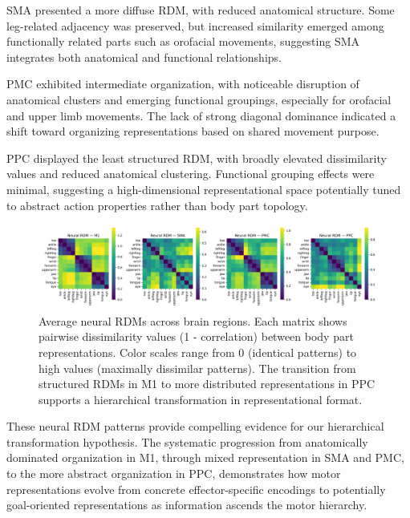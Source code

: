 \documentclass{article}
\begin{document}
SMA presented a more diffuse RDM, with reduced anatomical structure. Some leg-related adjacency was preserved, but increased similarity emerged among functionally related parts such as orofacial movements, suggesting SMA integrates both anatomical and functional relationships.

PMC exhibited intermediate organization, with noticeable disruption of anatomical clusters and emerging functional groupings, especially for orofacial and upper limb movements. The lack of strong diagonal dominance indicated a shift toward organizing representations based on shared movement purpose.

PPC displayed the least structured RDM, with broadly elevated dissimilarity values and reduced anatomical clustering. Functional grouping effects were minimal, suggesting a high-dimensional representational space potentially tuned to abstract action properties rather than body part topology.

\begin{figure}[!htbp] 
\centering 
\includegraphics[width=\textwidth]{results/average_neural_rdms.png} 
\caption{Average neural RDMs across brain regions. Each matrix shows pairwise dissimilarity values (1 - correlation) between body part representations. Color scales range from 0 (identical patterns) to high values (maximally dissimilar patterns). The transition from structured RDMs in M1 to more distributed representations in PPC supports a hierarchical transformation in representational format.} 
\label{fig:neural_rdms} 
\end{figure}

These neural RDM patterns provide compelling evidence for our hierarchical transformation hypothesis. The systematic progression from anatomically dominated organization in M1, through mixed representation in SMA and PMC, to the more abstract organization in PPC, demonstrates how motor representations evolve from concrete effector-specific encodings to potentially goal-oriented representations as information ascends the motor hierarchy.


\end{document}
